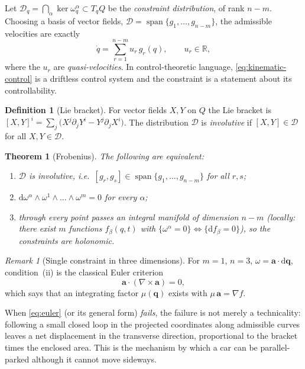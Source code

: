 \documentclass[11pt,a4paper]{article}
\theoremstyle{definition}
\newtheorem{definition}{Definition}[section]
\theoremstyle{plain}
\newtheorem{theorem}{Theorem}[section]
\theoremstyle{remark}
\newtheorem{remark}{Remark}[section]
\newcommand{\R}{\mathbb{R}}
\newcommand{\dd}{\mathrm{d}}
\DeclareMathOperator{\Span}{span}
\begin{document}
Let $\mathcal D_q=\bigcap_\alpha\ker\omega^\alpha_q\subset T_qQ$ be the
\emph{constraint distribution}, of rank $n-m$. Choosing a basis of vector fields,
$\mathcal D=\Span\{g_1,\dots,g_{n-m}\}$, the admissible velocities are exactly
\begin{equation}\label{eq:kinematic-control}
  \dot q=\sum_{r=1}^{n-m}u_r\,g_r(q),\qquad u_r\in\R,
\end{equation}
where the $u_r$ are \emph{quasi-velocities}. In control-theoretic language, \eqref{eq:kinematic-control} is a
driftless control system and the constraint is a statement about its controllability.

\begin{definition}[Lie bracket]
For vector fields $X,Y$ on $Q$ the Lie bracket is $[X,Y]^i=\sum_j\bigl(X^j\partial_jY^i-Y^j\partial_jX^i\bigr)$.
The distribution $\mathcal D$ is \emph{involutive} if $[X,Y]\in\mathcal D$ for all $X,Y\in\mathcal D$.
\end{definition}

\begin{theorem}[Frobenius]\label{thm:frobenius}
The following are equivalent:
\begin{enumerate}[label=(\roman*),leftmargin=2em]
  \item $\mathcal D$ is involutive, i.e.\ $[g_r,g_s]\in\Span\{g_1,\dots,g_{n-m}\}$ for all $r,s$;
  \item $\dd\omega^\alpha\wedge\omega^1\wedge\dots\wedge\omega^m=0$ for every $\alpha$;
  \item through every point passes an integral manifold of dimension $n-m$ (locally: there
        exist $m$ functions $f_\beta(q,t)$ with $\{\omega^\alpha=0\}\Longleftrightarrow\{\dd f_\beta=0\}$),
        so the constraints are holonomic.
\end{enumerate}
\end{theorem}

\begin{remark}[Single constraint in three dimensions]
For $m=1$, $n=3$, $\omega=\mathbf a\cdot\dd\mathbf q$, condition~(ii) is the classical
Euler criterion
\begin{equation}\label{eq:euler}
  \mathbf a\cdot(\nabla\times\mathbf a)=0,
\end{equation}
which says that an integrating factor $\mu(\mathbf q)$ exists with $\mu\,\mathbf a=\nabla f$.
\end{remark}

When \eqref{eq:euler} (or its general form) \emph{fails}, the failure is not merely a
technicality: following a small closed loop in the projected coordinates along admissible
curves leaves a net displacement in the transverse direction, proportional to the bracket
times the enclosed area. This is the mechanism by which a car can be parallel-parked
although it cannot move sideways.
\end{document}
